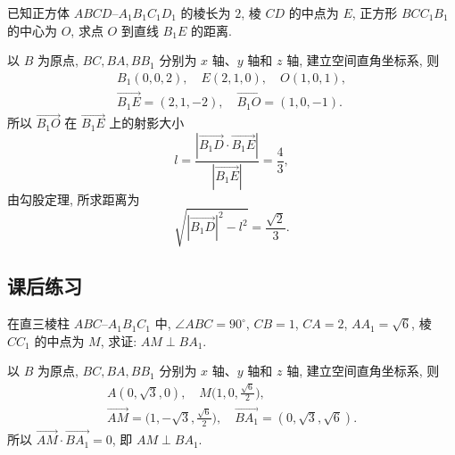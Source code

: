 \begin{exercise}
    已知正方体 $ABCD\text{--}A_1B_1C_1D_1$ 的棱长为 $2$, 棱 $CD$ 的中点为 $E$, 正方形 $BCC_1B_1$ 的中心为 $O$, 求点 $O$ 到直线 $B_1E$ 的距离.
\end{exercise}
\beginsolution
    以 $B$ 为原点, $BC, BA, BB_1$ 分别为 $x$ 轴、$y$ 轴和 $z$ 轴, 建立空间直角坐标系, 则
    \[\begin{gathered}
        B_1(0,0,2),\quad E(2,1,0),\quad O(1,0,1),\\
        \overrightarrow{B_1E}= (2,1,-2),\quad 
        \overrightarrow{B_1O}= (1,0,-1).
    \end{gathered}\]
    所以 $\overrightarrow{B_1O}$ 在 $\overrightarrow{B_1E}$ 上的射影大小
    \[l= \frac{|\overrightarrow{B_1D}\cdot \overrightarrow{B_1E}|}{|\overrightarrow{B_1E}|}
    = \frac43,\]
    由勾股定理, 所求距离为
    \[\sqrt{|\overrightarrow{B_1D}|^2- l^2}= \frac{\sqrt2}{3}.\]
\endsolution

      
        
    
\subsection{课后练习}

\begin{exercise}
    在直三棱柱 $ABC\text{--}A_1B_1C_1$ 中, $\angle ABC= 90^\circ$, $CB=1$, $CA=2$, $AA_1= \sqrt6$, 棱 $CC_1$ 的中点为 $M$, 求证: $AM\perp BA_1$.
\end{exercise}
\beginsolution
    以 $B$ 为原点, $BC, BA, BB_1$ 分别为 $x$ 轴、$y$ 轴和 $z$ 轴, 建立空间直角坐标系, 则
    \[\begin{gathered}
        A(0,\sqrt3,0),\quad M\biggl(1,0,\frac{\sqrt6}2\biggr),\\
        \overrightarrow{AM}= \biggl(1,-\sqrt3,\frac{\sqrt6}2\biggr),\quad 
        \overrightarrow{BA_1}= (0,\sqrt3,\sqrt6).
    \end{gathered}\]
    所以 $\overrightarrow{AM}\cdot\overrightarrow{BA_1}= 0$, 即 $AM\perp BA_1$.
\endsolution

